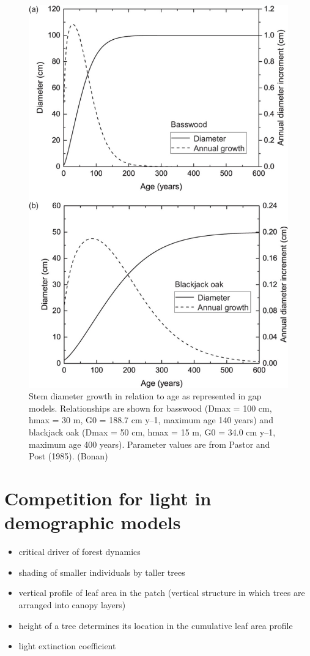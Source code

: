 \documentclass[12pt,oneside]{book}
\providecommand{\tightlist}{%
  \setlength{\itemsep}{0pt}\setlength{\parskip}{0pt}}
\begin{document}
\begin{figure}

{\centering \includegraphics[width=0.8\linewidth]{figures/chap6/f626_growth strategies} 

}

\caption{Stem diameter growth in relation to age as represented in gap models. Relationships are shown for basswood (Dmax = 100 cm, hmax = 30 m, G0 = 188.7 cm y–1, maximum age 140 years) and blackjack oak (Dmax = 50 cm, hmax = 15 m, G0 = 34.0 cm y–1, maximum age 400 years). Parameter values are from Pastor and Post (1985). (Bonan)}\label{fig:f626}
\end{figure}

\section{Competition for light in demographic
models}\label{competition-for-light-in-demographic-models}

\begin{itemize}
\tightlist
\item
  critical driver of forest dynamics
\item
  shading of smaller individuals by taller trees
\item
  vertical profile of leaf area in the patch (vertical structure in
  which trees are arranged into canopy layers)
\item
  height of a tree determines its location in the cumulative leaf area
  profile
\item
  light extinction coefficient
\end{itemize}
\end{document}
